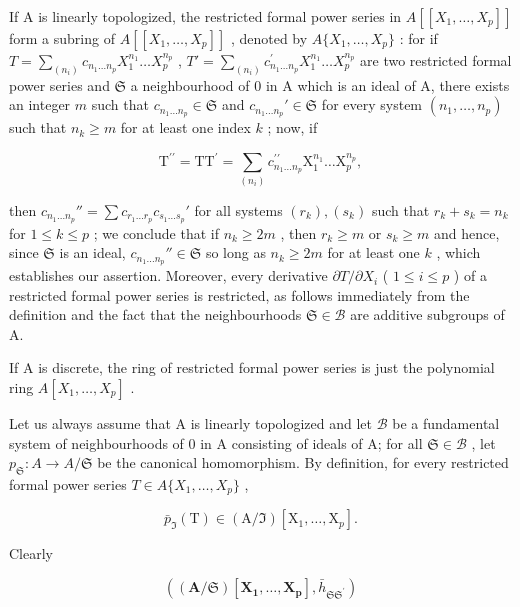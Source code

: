 If A is linearly topologized, the restricted formal power series in \(A[[X_{1},\ldots,X_{p}]]\) form a subring of \(A[[X_{1},\ldots,X_{p}]]\) , denoted by \(A\{X_{1},\ldots,X_{p}\}\) : for if \(T=\sum_{(n_{i})}c_{n_{1}\ldots n_{p}}X_{1}^{n_{1}}\ldots X_{p}^{n_{p}}\) , \(T'=\sum_{(n_{i})}c_{n_{1}\ldots n_{p}}^{'}X_{1}^{n_{1}}\ldots X_{p}^{n_{p}}\) are two restricted formal power series and \(\mathfrak{S}\) a neighbourhood of 0 in A which is an ideal of A, there exists an integer \(m\) such that \(c_{n_1\ldots n_p} \in \mathfrak{S}\) and \(c_{n_1\ldots n_p}' \in \mathfrak{S}\) for every system \((n_1, \ldots, n_p)\) such that \(n_k \geqslant m\) for at least one index \(k\) ; now, if

\[
\mathrm{T} ^ {\prime \prime} = \mathrm{TT} ^ {\prime} = \sum_ {(n _ {i})} c _ {n _ {1} \dots n _ {p}} ^ {\prime \prime} \mathrm{X} _ {1} ^ {n _ {1}} \dots \mathrm{X} _ {p} ^ {n _ {p}},
\]

then \(c_{n_1 \ldots n_p}'' = \sum c_{r_1 \ldots r_p} c_{s_1 \ldots s_p}'\) for all systems \((r_k), (s_k)\) such that \(r_k + s_k = n_k\) for \(1 \leqslant k \leqslant p\) ; we conclude that if \(n_k \geqslant 2m\) , then \(r_k \geqslant m\) or \(s_k \geqslant m\) and hence, since \(\mathfrak{S}\) is an ideal, \(c_{n_1 \ldots n_p}'' \in \mathfrak{S}\) so long as \(n_k \geqslant 2m\) for at least one \(k\) , which establishes our assertion. Moreover, every derivative \(\partial T / \partial X_i\) ( \(1 \leqslant i \leqslant p\) ) of a restricted formal power series is restricted, as follows immediately from the definition and the fact that the neighbourhoods \(\mathfrak{S} \in \mathcal{B}\) are additive subgroups of A.

If A is discrete, the ring of restricted formal power series is just the polynomial ring \(A[X_{1},\ldots,X_{p}]\) .

Let us always assume that A is linearly topologized and let \(\mathcal{B}\) be a fundamental system of neighbourhoods of 0 in A consisting of ideals of A; for all \(\mathfrak{S} \in \mathcal{B}\) , let \(p_{\mathfrak{S}}: A \to A/\mathfrak{S}\) be the canonical homomorphism. By definition, for every restricted formal power series \(T \in A\{X_{1}, \ldots, X_{p}\}\) ,

\[
\bar {p} _ {\Im} (\mathrm{T}) \in (\mathrm{A} / \Im) [ \mathrm{X} _ {1}, \dots , \mathrm{X} _ {p} ].
\]

Clearly

\[
((\mathbf {A} / \mathfrak {S}) [ \mathbf {X _ {1}}, \dots , \mathbf {X _ {p}} ], \bar {h} _ {\mathfrak {S} \mathfrak {S} ^ {\prime}})
\]

